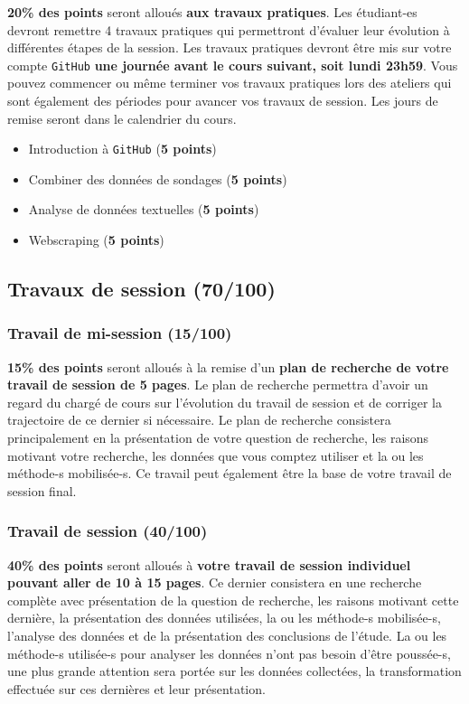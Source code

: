\documentclass[
  letterpaper,
  DIV=11,
  numbers=noendperiod]{scrartcl}
\begin{document}
\textbf{20\% des points} seront alloués \textbf{aux travaux pratiques}.
Les étudiant-es devront remettre 4 travaux pratiques qui permettront
d'évaluer leur évolution à différentes étapes de la session. Les travaux
pratiques devront être mis sur votre compte \texttt{GitHub} \textbf{une
journée avant le cours suivant, soit lundi 23h59}. Vous pouvez commencer
ou même terminer vos travaux pratiques lors des ateliers qui sont
également des périodes pour avancer vos travaux de session. Les jours de
remise seront dans le calendrier du cours.

\begin{itemize}
\item
  Introduction à \texttt{GitHub} (\textbf{5 points})
\item
  Combiner des données de sondages (\textbf{5 points})
\item
  Analyse de données textuelles (\textbf{5 points})
\item
  Webscraping (\textbf{5 points})
\end{itemize}

\subsection{Travaux de session (70/100)}\label{travaux-de-session-70100}

\subsubsection{Travail de mi-session
(15/100)}\label{travail-de-mi-session-15100}

\textbf{15\% des points} seront alloués à la remise d'un \textbf{plan de
recherche de votre travail de session de 5 pages}. Le plan de recherche
permettra d'avoir un regard du chargé de cours sur l'évolution du
travail de session et de corriger la trajectoire de ce dernier si
nécessaire. Le plan de recherche consistera principalement en la
présentation de votre question de recherche, les raisons motivant votre
recherche, les données que vous comptez utiliser et la ou les méthode-s
mobilisée-s. Ce travail peut également être la base de votre travail de
session final.

\subsubsection{Travail de session
(40/100)}\label{travail-de-session-40100}

\textbf{40\% des points} seront alloués à \textbf{votre travail de
session individuel pouvant aller de 10 à 15 pages}. Ce dernier
consistera en une recherche complète avec présentation de la question de
recherche, les raisons motivant cette dernière, la présentation des
données utilisées, la ou les méthode-s mobilisée-s, l'analyse des
données et de la présentation des conclusions de l'étude. La ou les
méthode-s utilisée-s pour analyser les données n'ont pas besoin d'être
poussée-s, une plus grande attention sera portée sur les données
collectées, la transformation effectuée sur ces dernières et leur
présentation.
\end{document}
